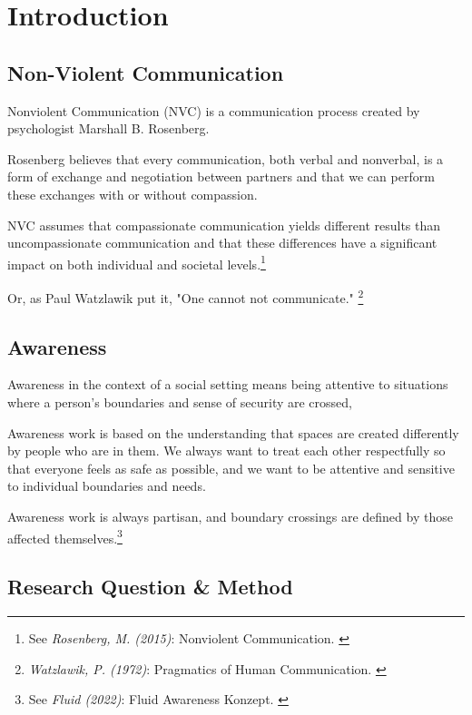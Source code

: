 %
%

\pagebreak
\section{Introduction}

\onehalfspacing

\subsection{Non-Violent Communication}

Nonviolent Communication (NVC) is a communication process created by psychologist Marshall B. Rosenberg.

Rosenberg believes that every communication, both verbal and nonverbal, is a form of exchange and negotiation between partners and that we can perform these exchanges with or without compassion.

NVC assumes that compassionate communication yields different results than uncompassionate communication and that these differences have a significant impact on both individual and societal levels.\footnote{See \textit{Rosenberg, M. (2015)}: Nonviolent Communication. \cite{rosenbergNvc}}

Or, as Paul Watzlawik put it, "One cannot not communicate." \footnote{\textit{Watzlawik, P. (1972)}: Pragmatics of Human Communication. \cite{watzlawick}}

\subsection{Awareness}

Awareness in the context of a social setting means being attentive to situations where a person's boundaries and sense of security are crossed,

Awareness work is based on the understanding that spaces are created differently by people who are in them. We always want to treat each other respectfully so that everyone feels as safe as possible, and we want to be attentive and sensitive to individual boundaries and needs.

Awareness work is always partisan, and boundary crossings are defined by those affected themselves.\footnote{See \textit{Fluid (2022)}: Fluid Awareness Konzept. \cite{fluidAware}}

\subsection{Research Question \& Method}


